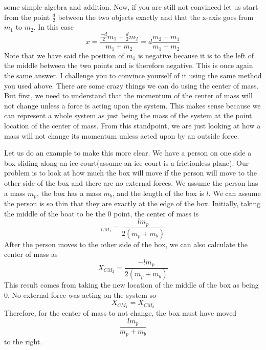 some simple algebra and addition. Now, if you are still not convinced let us start from the point $\frac{d}{2}$ between the two objects exactly and that the x-axis goes from $m_1$ to $m_2$.  In this case \begin{equation}x=\frac{\frac{-d}{2}m_1+\frac{d}{2}m_2}{m_1+m_2}=d\frac{m_2-m_1}{m_1+m_2}\end{equation} Note that we have said the position of $m_1$ is negative because it is to the left of the middle between the two points and is therefore negative. This is once again the same answer. I challenge you to convince yourself of it using the same method you used above. There are some crazy things we can do using the center of mass. But first, we need to understand that the momentum of the center of mass will not change unless a force is acting upon the system. This makes sense because we can represent a whole system as just being the mass of the system at the point location of the center of mass. From this standpoint, we are just looking at how a mass will not change its momentum unless acted upon by an outside force. 

Let us do an example to make this more clear. We have a person on one side a box sliding along an ice court(assume an ice court is a frictionless plane). Our problem is to look at how much the box will move if the person will move to the other side of the box and there are no external forces. We assume the person has a mass $m_p$, the box has a mass $m_b$, and the length of the box is $l$. We can assume the person is so thin that they are exactly at the edge of the box. Initially, taking the middle of the boat to be the 0 point, the center of mass is \begin{equation}_{CM_1} = \frac{lm_p}{2\left(m_p+m_b\right)}\end{equation} After the person moves to the other side of the box, we can also calculate the center of mass as \begin{equation}X_{CM_2} = \frac{-lm_p}{2\left(m_p+m_b\right)}\end{equation} This result comes from taking the new location of the middle of the box as being 0. No external force was acting on the system so $$X_{CM_1}=X_{CM_2}$$ Therefore, for the center of mass to not change, the box must have moved $$\frac{lm_p}{m_p+m_b}$$ to the right.

